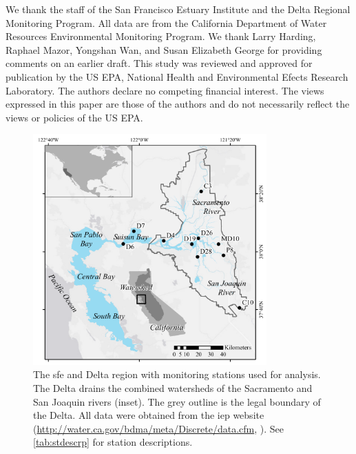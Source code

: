 \documentclass[letterpaper,12pt,oneside]{article}\usepackage[]{graphicx}\usepackage[]{color}
\begin{document}
We thank the staff of the San Francisco Estuary Institute and the Delta Regional Monitoring Program.  All data are from the California Department of Water Resources Environmental Monitoring Program. We thank Larry Harding, Raphael Mazor, Yongshan Wan, and Susan Elizabeth George for providing comments on an earlier draft. This study was reviewed and approved for publication by the US EPA, National Health and Environmental Efects Research Laboratory. The authors declare no competing financial interest. The views expressed in this paper are those of the authors and do not necessarily reflect the views or policies of the US EPA. 

\begin{singlespace}


\end{singlespace}
\clearpage


\begin{figure}
\centering
\includegraphics[width=0.8\textwidth,page=1]{figs/delt_map.pdf}
\caption{The \acl{sfe} and Delta region with monitoring stations used for analysis. The Delta drains the combined watersheds of the Sacramento and San Joaquin rivers (inset). The grey outline is the legal boundary of the Delta. All data were obtained from the \acl{iep} website (\url{http://water.ca.gov/bdma/meta/Discrete/data.cfm}, \cite{IEP13}). See \cref{tab:stdescrp} for station descriptions.}
\label{fig:delt_map}   
\end{figure}
\end{document}
